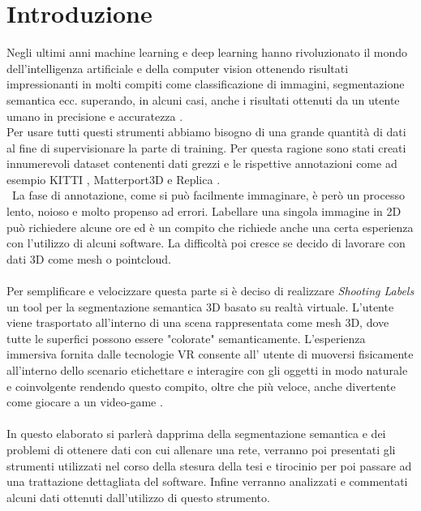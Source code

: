 \chapter*{Introduzione}
{}

Negli ultimi anni machine learning e deep learning hanno rivoluzionato il mondo dell'intelligenza artificiale e della computer vision ottenendo risultati impressionanti in molti compiti come classificazione di immagini, segmentazione semantica ecc. superando, in alcuni casi, anche i risultati ottenuti da un utente umano in precisione e accuratezza \cite{imagenet}.\\
Per usare tutti questi strumenti abbiamo bisogno di una grande quantità di dati al fine di supervisionare la parte di training. Per questa ragione sono stati creati innumerevoli dataset contenenti dati grezzi e le rispettive annotazioni come ad esempio KITTI \cite{KITTI}, Matterport3D \cite{Matter} e Replica \cite{Replica}.\\\
La fase di annotazione, come si può facilmente immaginare, è però un processo lento, noioso e molto propenso ad errori. Labellare una singola immagine in 2D può richiedere alcune ore ed è un compito che richiede anche una certa esperienza con l'utilizzo di alcuni software. La difficoltà poi cresce se decido di lavorare con dati 3D come mesh o pointcloud.\\\\
Per semplificare e velocizzare questa parte si è deciso di realizzare \textit{Shooting Labels} un tool per la segmentazione semantica 3D basato su realtà virtuale. L'utente viene trasportato all'interno di una scena rappresentata come mesh 3D, dove tutte le superfici possono essere "colorate" semanticamente. L'esperienza immersiva fornita dalle tecnologie VR consente all' utente di muoversi fisicamente all'interno dello scenario etichettare e interagire con gli oggetti in modo naturale e coinvolgente rendendo questo compito, oltre che più veloce, anche divertente come giocare a un video-game \cite{SL}.\\\\
In questo elaborato si parlerà dapprima della segmentazione semantica e dei problemi di ottenere dati con cui allenare una rete, verranno poi presentati gli strumenti utilizzati nel corso della stesura della tesi e tirocinio per poi passare ad una trattazione dettagliata del software. Infine verranno analizzati e commentati alcuni dati ottenuti dall'utilizzo di questo strumento.